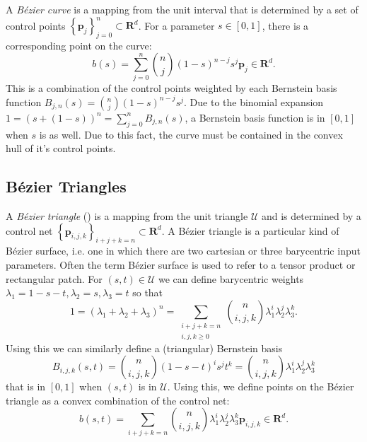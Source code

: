 \documentclass[letterpaper,10pt]{article}
\theoremstyle{definition}
\newcommand{\reals}{\mathbf{R}}
\newcommand{\utri}{\mathcal{U}}
\begin{document}
A \emph{B\'{e}zier curve} is a mapping from the unit interval
that is determined by a set of control points
\(\left\{\bm{p}_j\right\}_{j = 0}^n \subset \reals^d\).
For a parameter \(s \in \left[0, 1\right]\), there is a corresponding
point on the curve:
\begin{equation}
b(s) = \sum_{j = 0}^n \binom{n}{j} (1 - s)^{n - j} s^j \bm{p}_j \in
  \reals^d.
\end{equation}
This is a combination of the control points weighted by
each Bernstein basis function
\(B_{j, n}(s) = \binom{n}{j} (1 - s)^{n - j} s^j\).
Due to the binomial expansion
\(1 = (s + (1 - s))^n = \sum_{j = 0}^n B_{j, n}(s)\),
a Bernstein basis function is in
\(\left[0, 1\right]\) when \(s\) is as well. Due to this fact, the
curve must be contained in the convex hull of it's control points.

\subsection{B\'{e}zier Triangles}

A \emph{B\'{e}zier triangle} (\cite[Chapter~17]{Farin2001}) is a
mapping from the unit triangle
\(\utri\) and is determined by a control net
\(\left\{\bm{p}_{i, j, k}\right\}_{i + j + k = n} \subset \reals^d\).
A B\'{e}zier triangle is a particular kind of B\'{e}zier surface, i.e. one
in which there are two cartesian or three barycentric input parameters.
Often the term B\'{e}zier surface is used to refer to a tensor product or
rectangular patch.
For \((s, t) \in \utri\) we can define barycentric weights
\(\lambda_1 = 1 - s - t, \lambda_2 = s, \lambda_3 = t\) so that
\begin{equation}
1 = \left(\lambda_1 + \lambda_2 + \lambda_3\right)^n =
  \sum_{\substack{i + j + k = n \\ i, j, k \geq 0}} \binom{n}{i, j, k}
  \lambda_1^i \lambda_2^j \lambda_3^k.
\end{equation}
Using this we can similarly define a (triangular) Bernstein basis
\begin{equation}
B_{i, j, k}(s, t) = \binom{n}{i, j, k} (1 - s - t)^i s^j t^k
  = \binom{n}{i, j, k} \lambda_1^i \lambda_2^j \lambda_3^k
\end{equation}
that is in \(\left[0, 1\right]\) when \((s, t)\) is in \(\utri\).
Using this, we define points on the B\'{e}zier triangle as a
convex combination of the control net:
\begin{equation}
b(s, t) = \sum_{i + j + k = n} \binom{n}{i, j, k}
  \lambda_1^i \lambda_2^j \lambda_3^k
  \bm{p}_{i, j, k} \in \reals^d.
\end{equation}
\end{document}
